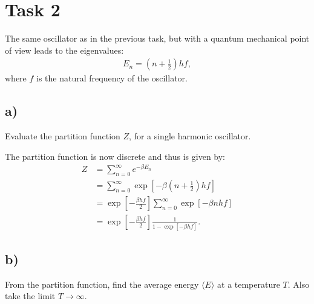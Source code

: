 \documentclass[a4paper]{article}
\begin{document}
\section*{Task 2}
The same oscillator as in the previous task, but with a quantum mechanical point of view leads to the eigenvalues:
\begin{align*}
    E_n = \left(n + \frac{1}{2}\right)hf,
\end{align*}where $f$ is the natural frequency of the oscillator.

\subsection*{a)}
Evaluate the partition function $Z$, for a single harmonic oscillator.

\vspace*{0.5cm}\noindent
The partition function is now discrete and thus is given by:
\begin{align}
    Z &= \sum_{n=0}^\infty e^{-\beta E_n}\nonumber\\
    &= \sum_{n=0}^\infty \exp\left[-\beta\left(n + \frac{1}{2}\right)hf\right]\nonumber\\
    &=\exp\left[-\frac{\beta hf}{2}\right]\sum_{n=0}^\infty \exp\left[-\beta nhf\right]\nonumber\\
    &= \exp\left[-\frac{\beta hf}{2}\right]\frac{1}{1-\exp\left[-\beta hf\right]}.\label{eq: Parition function}
\end{align}


\subsection*{b)}
From the partition function, find the average energy $\langle E \rangle$ at a temperature $T$. Also take the limit $T\to\infty$.
\end{document}
